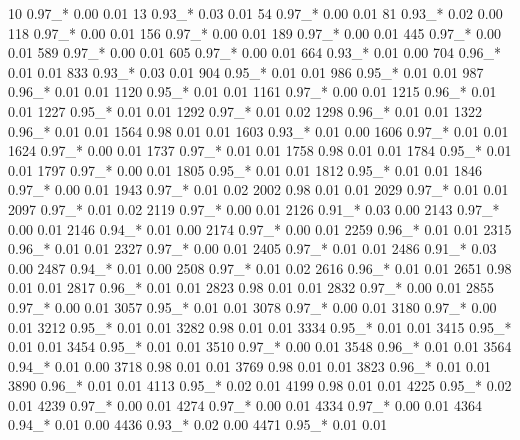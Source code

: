 \begin{Schunk}
\begin{Soutput}
10    0.97_*  0.00   0.01
13    0.93_*  0.03   0.01
54    0.97_*  0.00   0.01
81    0.93_*  0.02   0.00
118   0.97_*  0.00   0.01
156   0.97_*  0.00   0.01
189   0.97_*  0.00   0.01
445   0.97_*  0.00   0.01
589   0.97_*  0.00   0.01
605   0.97_*  0.00   0.01
664   0.93_*  0.01   0.00
704   0.96_*  0.01   0.01
833   0.93_*  0.03   0.01
904   0.95_*  0.01   0.01
986   0.95_*  0.01   0.01
987   0.96_*  0.01   0.01
1120  0.95_*  0.01   0.01
1161  0.97_*  0.00   0.01
1215  0.96_*  0.01   0.01
1227  0.95_*  0.01   0.01
1292  0.97_*  0.01   0.02
1298  0.96_*  0.01   0.01
1322  0.96_*  0.01   0.01
1564  0.98    0.01   0.01
1603  0.93_*  0.01   0.00
1606  0.97_*  0.01   0.01
1624  0.97_*  0.00   0.01
1737  0.97_*  0.01   0.01
1758  0.98    0.01   0.01
1784  0.95_*  0.01   0.01
1797  0.97_*  0.00   0.01
1805  0.95_*  0.01   0.01
1812  0.95_*  0.01   0.01
1846  0.97_*  0.00   0.01
1943  0.97_*  0.01   0.02
2002  0.98    0.01   0.01
2029  0.97_*  0.01   0.01
2097  0.97_*  0.01   0.02
2119  0.97_*  0.00   0.01
2126  0.91_*  0.03   0.00
2143  0.97_*  0.00   0.01
2146  0.94_*  0.01   0.00
2174  0.97_*  0.00   0.01
2259  0.96_*  0.01   0.01
2315  0.96_*  0.01   0.01
2327  0.97_*  0.00   0.01
2405  0.97_*  0.01   0.01
2486  0.91_*  0.03   0.00
2487  0.94_*  0.01   0.00
2508  0.97_*  0.01   0.02
2616  0.96_*  0.01   0.01
2651  0.98    0.01   0.01
2817  0.96_*  0.01   0.01
2823  0.98    0.01   0.01
2832  0.97_*  0.00   0.01
2855  0.97_*  0.00   0.01
3057  0.95_*  0.01   0.01
3078  0.97_*  0.00   0.01
3180  0.97_*  0.00   0.01
3212  0.95_*  0.01   0.01
3282  0.98    0.01   0.01
3334  0.95_*  0.01   0.01
3415  0.95_*  0.01   0.01
3454  0.95_*  0.01   0.01
3510  0.97_*  0.00   0.01
3548  0.96_*  0.01   0.01
3564  0.94_*  0.01   0.00
3718  0.98    0.01   0.01
3769  0.98    0.01   0.01
3823  0.96_*  0.01   0.01
3890  0.96_*  0.01   0.01
4113  0.95_*  0.02   0.01
4199  0.98    0.01   0.01
4225  0.95_*  0.02   0.01
4239  0.97_*  0.00   0.01
4274  0.97_*  0.00   0.01
4334  0.97_*  0.00   0.01
4364  0.94_*  0.01   0.00
4436  0.93_*  0.02   0.00
4471  0.95_*  0.01   0.01
\end{Soutput}
\end{Schunk}
